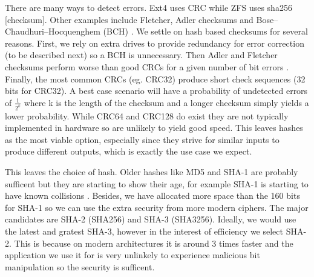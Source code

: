         There are many ways to detect errors. Ext4 uses CRC \cite{idk if ref}
        while ZFS uses sha256 \cite{ZFS_docs}[checksum]. Other examples include
        Fletcher, Adler checksums \cite{embedded_checksums} and
        Bose–Chaudhuri–Hocquenghem (BCH) \cite{flash_error_manual}. We settle
        on hash based checksums for several reasons. First, we rely on extra
        drives to provide redundancy for error correction (to be described
        next) so a BCH is unnecessary. Then Adler and Fletcher checksums
        perform worse than good CRCs for a given number of bit errors
        \citeauthor{embedded_checksums}. Finally, the most common CRCs (eg.
        CRC32) produce short check sequences (32 bits for CRC32). A best case
        scenario will have a probability of undetected errors of
        $\frac{1}{2^k}$
        where k is the length of the checksum \cite{embedded_checksums} and a
        longer checksum simply yields a lower probability. While CRC64 and
        CRC128 do exist they are not typically implemented in hardware so are
        unlikely to yield good speed. This leaves hashes as the most viable
        option, especially since they strive for similar inputs to produce
        different outputs, which is exactly the use case we expect.

        This leaves the choice of hash. Older hashes like MD5 and SHA-1 are
        probably sufficent but they are starting to show their age, for example
        SHA-1 is starting to have known collisions \cite{SHA_collision}.
        Besides, we have allocated more space than the 160 bits for SHA-1 so we
        can use the extra security from more modern ciphers. The major
        candidates are SHA-2 (SHA256) and SHA-3 (SHA3256). Ideally, we would
        use the latest and gratest SHA-3, however in the interest of efficiency
        we select SHA-2. This is because on modern architectures it is around 3
        times faster \cite{hash_stats} and the application we use it for is
        very unlinkely to experience malicious bit manipulation so the security
        is sufficent.


